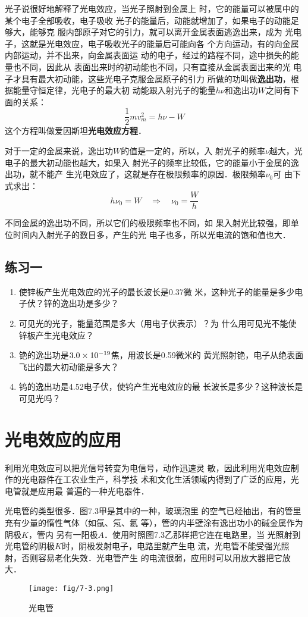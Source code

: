 光子说很好地解释了光电效应，当光子照射到金属上
时，它的能量可以被属中的某个电子全部吸收，电子吸收
光子的能量后，动能就增加了，如果电子的动能足够大，能够克
服内部原子对它的引力，就可以离开金属表面逃逸出来，成为
光电子，这就是光电效应，电子吸收光子的能量后可能向各
个方向运动，有的向金属内部运动，并不出来，向金属表面运
动的电子，经过的路程不同，途中损失的能量也不同，因此从
表面出来时的初动能也不同，只有直接从金属表面出来的光
电子才具有最大初动能，这些光电子克服金属原子的引力
所做的功叫做\textbf{逸出功}，根据能量守恒定律，光电子的最大初
动能跟入射光子的能量$h\nu$和逸出功$W$之间有下面的关系：
\[\frac{1}{2}mv^2_m=h\nu-W \]
这个方程叫做爱因斯坦\textbf{光电效应方程}．

对于一定的金属来说，逸出功$W$的值是一定的，所以，入
射光子的频率$\nu$越大，光电子的最大初动能也越大，如果入
射光子的频率比较低，它的能量小于金属的逸出功，就不能产
生光电效应了，这就是存在极限频率的原因．极限频率$\nu_0$可
由下式求出：
\[h\nu_0=W\quad \Rightarrow\quad \nu_0=\frac{W}{h} \]

不同金属的逸出功不同，所以它们的极限频率也不同，如
果入射光比较强，即单位时间内入射光子的数目多，产生的光
电子也多，所以光电流的饱和值也大．

\subsection*{练习一}

\begin{enumerate}
    \item 使锌板产生光电效应的光子的最长波长是0.37微
米，这种光子的能量是多少电子伏？锌的逸出功是多少？
\item 可见光的光子，能量范围是多大（用电子伏表示）？为
什么用可见光不能使锌板产生光电效应？
\item 铯的逸出功是$3.0\times10^{-19}$焦，用波长是0.59微米的
黄光照射铯，电子从绝表面飞出的最大初动能是多大？
\item 钨的逸出功是4.52电子伏，使钨产生光电效应的最
长波长是多少？这种波长是可见光吗？
\end{enumerate}

\section{光电效应的应用}

利用光电效应可以把光信号转变为电信号，动作迅速灵
敏，因此利用光电效应制作的光电器件在工农业生产，科学技
术和文化生活领域内得到了广泛的应用，光电管就是应用最
普遍的一种光电器件．

光电管的类型很多．图7.3甲是其中的一种，玻璃泡里
的空气已经抽出，有的管里充有少量的惰性气体（如氩、氖、氦
等），管的内半壁涂有逸出功小的碱金属作为阴极$K$，管内
另有一阳极$A$．使用时照图7.3乙那样把它连在电路里，当
光照射到光电管的阴极$K$时，阴极发射电子，电路里就产生电
流，光电管不能受强光照射，否则容易老化失效．光电管产生
的电流很弱，应用时可以用放大器把它放大．
\begin{figure}[htp]\centering
    \texttt{[image: fig/7-3.png]}
    \caption{光电管}
    \end{figure}

